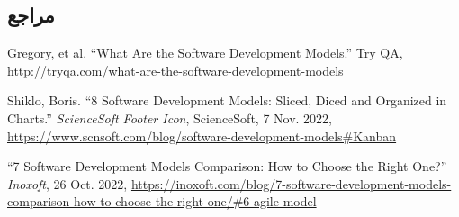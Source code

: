 {\begin{itemize}
\end{itemize}

\subsection*{مراجع}

\begin{latin}
	\begingroup
	\renewcommand{\section}[2]{}%
	
\begin{thebibliography}{9}

	Gregory, et al. “What Are the Software Development Models.” Try QA, \url{http://tryqa.com/what-are-the-software-development-models} 

	Shiklo, Boris. “8 Software Development Models: Sliced, Diced and Organized in Charts.” \textit{ScienceSoft Footer Icon}, ScienceSoft, 7 Nov. 2022, \url{https://www.scnsoft.com/blog/software-development-models\#Kanban}

	“7 Software Development Models Comparison: How to Choose the Right One?” \textit{Inoxoft}, 26 Oct. 2022, \url{https://inoxoft.com/blog/7-software-development-models-comparison-how-to-choose-the-right-one/\#6-agile-model}

	
\end{thebibliography}
\endgroup
\end{latin}

} 